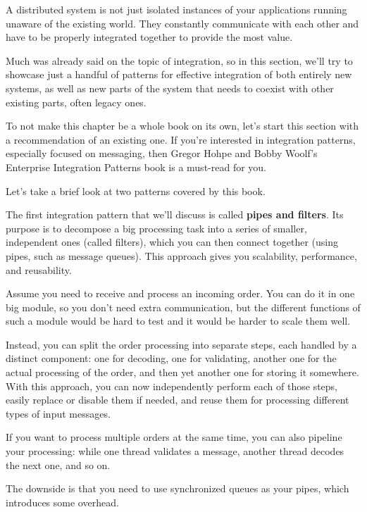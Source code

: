 

A distributed system is not just isolated instances of your applications running unaware of the existing world. They constantly communicate with each other and have to be properly integrated together to provide the most value.

Much was already said on the topic of integration, so in this section, we'll try to showcase just a handful of patterns for effective integration of both entirely new systems, as well as new parts of the system that needs to coexist with other existing parts, often legacy ones.

To not make this chapter be a whole book on its own, let's start this section with a recommendation of an existing one. If you're interested in integration patterns, especially focused on messaging, then Gregor Hohpe and Bobby Woolf's Enterprise Integration Patterns book is a must-read for you.

Let's take a brief look at two patterns covered by this book.



The first integration pattern that we'll discuss is called \textbf{pipes and filters}. Its purpose is to decompose a big processing task into a series of smaller, independent ones (called filters), which you can then connect together (using pipes, such as message queues). This approach gives you scalability, performance, and reusability.

Assume you need to receive and process an incoming order. You can do it in one big module, so you don't need extra communication, but the different functions of such a module would be hard to test and it would be harder to scale them well.

Instead, you can split the order processing into separate steps, each handled by a distinct component: one for decoding, one for validating, another one for the actual processing of the order, and then yet another one for storing it somewhere. With this approach, you can now independently perform each of those steps, easily replace or disable them if needed, and reuse them for processing different types of input messages.

If you want to process multiple orders at the same time, you can also pipeline your processing: while one thread validates a message, another thread decodes the next one, and so on.

The downside is that you need to use synchronized queues as your pipes, which introduces some overhead.

